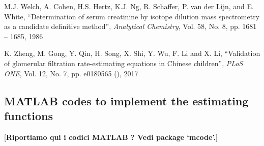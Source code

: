 \documentclass[10pt,final]{siamltex}
\begin{document}
\begin{thebibliography}{99}
   M.J. Welch, A. Cohen, H.S. Hertz, K.J. Ng, R. Schaffer, P. van der Lijn, and E. White, ``Determination of serum creatinine by isotope dilution mass spectrometry as a candidate definitive method'', \textit{Analytical Chemistry}, Vol. 58, No. 8, pp. 1681 -- 1685, 1986

   K. Zheng, M. Gong, Y. Qin, H. Song, X. Shi, Y. Wu, F. Li and X. Li, ``Validation of glomerular filtration rate-estimating equations in Chinese children'', \textit{PLoS ONE}, Vol. 12, No. 7, pp. e0180565 (), 2017
\end{thebibliography}

\begin{appendix}
\section{MATLAB codes to implement the estimating functions}
[{\bf\red Riportiamo qui i codici MATLAB ? Vedi package `mcode'.}]
\end{appendix}
\end{document}

